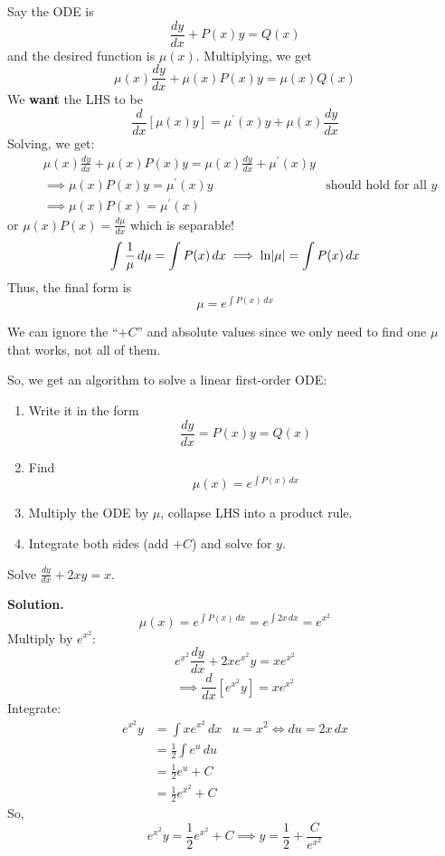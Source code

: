 Say the ODE is
\[ \frac{dy}{dx} +P(x)y=Q(x) \]
and the desired function is $ \mu(x) $. Multiplying, we get
\[ \mu(x)\frac{dy}{dx} +\mu(x)P(x)y=\mu(x)Q(x) \]
We \textbf{want} the LHS to be
\[ \frac{d}{dx} \left[ \mu(x)y \right]=\mu^\prime(x)y+\mu(x)\frac{dy}{dx}  \]
Solving, we get:
\begin{align*}
     & \mu(x)\frac{dy}{dx} +\mu(x)P(x)y=\mu(x)\frac{dy}{dx}+\mu^\prime(x)y                                 \\
     & \implies \mu(x)P(x)y=\mu^\prime(x)y                                 & \text{should hold for all } y \\
     & \implies \mu(x)P(x)=\mu^\prime(x)
\end{align*}
or
$ \displaystyle  \mu(x)P(x)=\frac{d\mu}{dx}  $
which is separable!
\[ \int \frac{1}{\mu} \, d{\mu} =\int P(x)\, d{x}\implies \ln\lvert\mu\rvert=\int P(x)\, d{x} \]
Thus, the final form is
\[ \boxed{\mu=e^{\int P(x)\, d{x}}} \]
\begin{Remark}{}{}
    We can ignore the ``$ +C $'' and absolute values since we only need to find one $ \mu $
    that works, not all of them.
\end{Remark}
So, we get an algorithm to solve a linear first-order ODE\@:
\begin{enumerate}[label=(\Roman*)]
    \item Write it in the form
          \[ \frac{dy}{dx}=P(x)y=Q(x) \]
    \item Find
          \[ \mu(x)=e^{\int P(x)\, d{x}} \]
    \item Multiply the ODE by $ \mu $, collapse LHS into a product rule.
    \item Integrate both sides (add $ +C $) and solve for $ y $.
\end{enumerate}

\begin{Example}{}{}
    Solve
    $ \displaystyle  \frac{dy}{dx} +2xy=x $.

    \textbf{Solution.}
    \[ \mu(x)=e^{\int P(x)\, d{x}}=e^{\int 2x\, d{x}}=e^{x^2} \]
    Multiply by $ e^{x^2} $:
    \[ e^{x^2}\frac{dy}{dx} +2xe^{x^2}y=xe^{x^2} \]
    \[ \implies \frac{d}{dx} \left[ e^{x^2}y \right]=xe^{x^2} \]
    Integrate:
    \begin{align*}
        e^{x^2}y
         & =\int x e^{x^2}\, d{x}       & u=x^2\iff du=2x\,dx \\
         & =\frac{1}{2} \int e^u\, d{u}                       \\
         & =\frac{1}{2} e^{u}+C                               \\
         & =\frac{1}{2}e^{x^2}+C
    \end{align*}
    So,
    \[ e^{x^2}y=\frac{1}{2} e^{x^2}+C\implies y=\frac{1}{2} +\frac{C}{e^{x^2}} \]
\end{Example}

